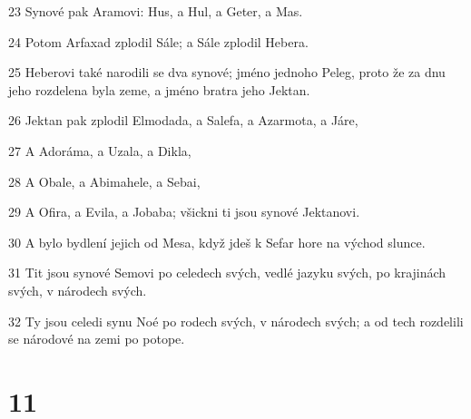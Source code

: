\par 23 Synové pak Aramovi: Hus, a Hul, a Geter, a Mas.
\par 24 Potom Arfaxad zplodil Sále; a Sále zplodil Hebera.
\par 25 Heberovi také narodili se dva synové; jméno jednoho Peleg, proto že za dnu jeho rozdelena byla zeme, a jméno bratra jeho Jektan.
\par 26 Jektan pak zplodil Elmodada, a Salefa, a Azarmota, a Járe,
\par 27 A Adoráma, a Uzala, a Dikla,
\par 28 A Obale, a Abimahele, a Sebai,
\par 29 A Ofira, a Evila, a Jobaba; všickni ti jsou synové Jektanovi.
\par 30 A bylo bydlení jejich od Mesa, když jdeš k Sefar hore na východ slunce.
\par 31 Tit jsou synové Semovi po celedech svých, vedlé jazyku svých, po krajinách svých, v národech svých.
\par 32 Ty jsou celedi synu Noé po rodech svých, v národech svých; a od tech rozdelili se národové na zemi po potope.

\chapter{11}

